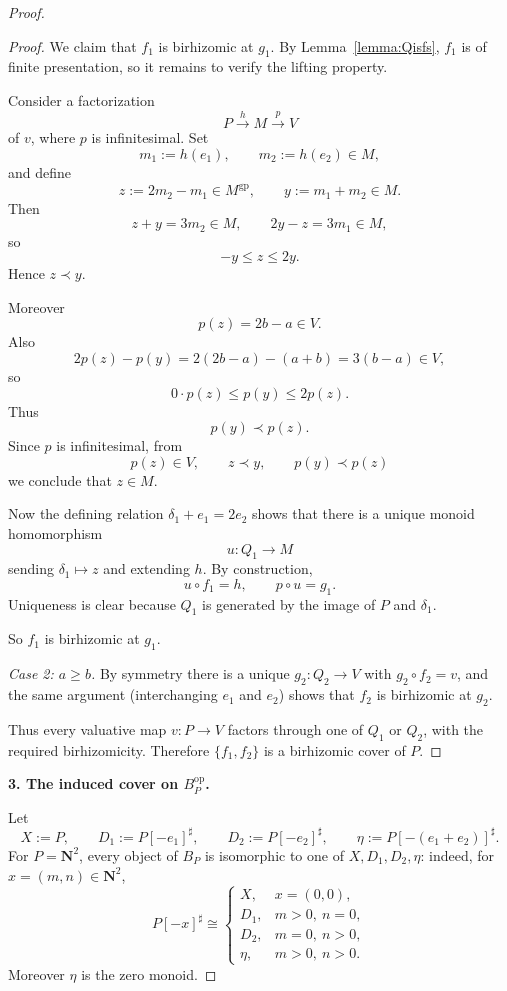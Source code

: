 \documentclass[11pt]{article}
\begin{document}
\begin{proof}
\begin{proof}
We claim that \(f_1\) is birhizomic at \(g_1\). By Lemma~\ref{lemma:Qisfs}, \(f_1\) is of finite presentation, so it remains to verify the lifting property.

Consider a factorization
\[
P \xrightarrow{h} M \xrightarrow{p} V
\]
of \(v\), where \(p\) is infinitesimal. Set
\[
m_1:=h(e_1),\qquad m_2:=h(e_2)\in M,
\]
and define
\[
z:=2m_2-m_1\in M^{\mathrm{gp}},\qquad y:=m_1+m_2\in M.
\]
Then
\[
z+y=3m_2\in M,\qquad 2y-z=3m_1\in M,
\]
so
\[
-y\le z\le 2y.
\]
Hence \(z\prec y\).

Moreover
\[
p(z)=2b-a\in V.
\]
Also
\[
2p(z)-p(y)=2(2b-a)-(a+b)=3(b-a)\in V,
\]
so
\[
0\cdot p(z)\le p(y)\le 2p(z).
\]
Thus
\[
p(y)\prec p(z).
\]
Since \(p\) is infinitesimal, from
\[
p(z)\in V,\qquad z\prec y,\qquad p(y)\prec p(z)
\]
we conclude that \(z\in M\).

Now the defining relation \(\delta_1+e_1=2e_2\) shows that there is a unique monoid homomorphism
\[
u\colon Q_1\to M
\]
sending \(\delta_1\mapsto z\) and extending \(h\). By construction,
\[
u\circ f_1=h,\qquad p\circ u=g_1.
\]
Uniqueness is clear because \(Q_1\) is generated by the image of \(P\) and \(\delta_1\).

So \(f_1\) is birhizomic at \(g_1\).

\smallskip
\noindent
\emph{Case 2: \(a\ge b\).}
By symmetry there is a unique \(g_2\colon Q_2\to V\) with \(g_2\circ f_2=v\), and the same argument (interchanging \(e_1\) and \(e_2\)) shows that \(f_2\) is birhizomic at \(g_2\).

\smallskip
Thus every valuative map \(v\colon P\to V\) factors through one of \(Q_1\) or \(Q_2\), with the required birhizomicity. Therefore \(\{f_1,f_2\}\) is a birhizomic cover of \(P\).
\end{proof}

\medskip
\noindent
\textbf{3. The induced cover on \(B_P^{\mathrm{op}}\).}

Let
\[
X:=P,\qquad D_1:=P[-e_1]^\sharp,\qquad D_2:=P[-e_2]^\sharp,\qquad \eta:=P[-(e_1+e_2)]^\sharp.
\]
For \(P=\mathbf N^2\), every object of \(B_P\) is isomorphic to one of \(X,D_1,D_2,\eta\): indeed, for \(x=(m,n)\in \mathbf N^2\),
\[
P[-x]^\sharp \cong
\begin{cases}
X,& x=(0,0),\\
D_1,& m>0,\ n=0,\\
D_2,& m=0,\ n>0,\\
\eta,& m>0,\ n>0.
\end{cases}
\]
Moreover \(\eta\) is the zero monoid.


\end{proof}
\end{document}
